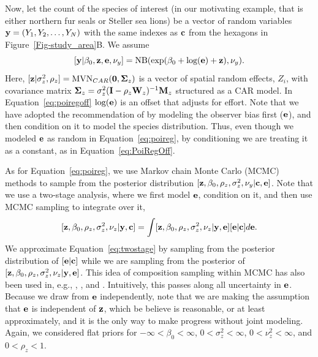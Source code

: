 \documentclass[11pt, titlepage]{article}
\begin{document}
\begin{spacing}{1.9}
\begin{flushleft}
Now, let the count of the species of interest (in our motivating example, that is either northern fur seals or Steller sea lions) be a vector of random variables $\mathbf{y} = (Y_{1}, Y_{2}, \ldots, Y_{N})$ with the same indexes as $\mathbf{c}$ from the hexagons in Figure~\ref{Fig-study_area}B.  We assume
\begin{equation} \label{eq:poiregoff}
[\mathbf{y}|\beta_{0},\mathbf{z},\mathbf{e},\nu_{y}] = \textrm{NB}(\exp(\beta_{0} + \textrm{log}(\mathbf{e}) + \mathbf{z}), \nu_{y}).
\end{equation}
Here, $[\mathbf{z}|\sigma^{2}_{z}, \rho_{z}] = \textrm{MVN}_{CAR}(\mathbf{0},\mbox{\boldmath $\Sigma$}_{z})$ is a vector of spatial random effects, $Z_{i}$, with covariance matrix $\mbox{\boldmath $\Sigma$}_{z} = \sigma_{z}^{2}(\mathbf{I} - \rho_{z}\mathbf{W}_{z})^{-1}\mathbf{M}_{z}$ structured as a CAR model.  In Equation~\eqref{eq:poiregoff} $\textrm{log}(\mathbf{e})$ is an offset that adjusts for effort. Note that we have adopted the recommendation of \citet{warton_model-based_2013} by modeling the observer bias first ($\mathbf{e}$), and then condition on it to model the species distribution.  Thus, even though we modeled $\mathbf{e}$ as random in Equation~\eqref{eq:poireg}, by conditioning we are treating it as a constant, as in Equation~\eqref{eq:PoiRegOff}.

As for Equation~\eqref{eq:poireg}, we use Markov chain Monte Carlo (MCMC) methods to sample from the posterior distribution $[\mathbf{z}, \beta_{0}, \rho_{z}, \sigma^{2}_{z},\nu_{y}|\mathbf{c},\mathbf{e}]$. Note that we use a two-stage analysis, where we first model $\mathbf{e}$, condition on it, and then use MCMC sampling to integrate over it, 
\begin{equation} \label{eq:twostage}
[\mathbf{z}, \beta_{0}, \rho_{z}, \sigma^{2}_{z},\nu_{z}|\mathbf{y},\mathbf{c}] = \int[\mathbf{z}, \beta_{0}, \rho_{z}, \sigma^{2}_{z},\nu_{z}|\mathbf{y},\mathbf{e}][\mathbf{e}|\mathbf{c}]d\mathbf{e}.
\end{equation}
We approximate Equation~\eqref{eq:twostage} by sampling from the posterior distribution of $[\mathbf{e}|\mathbf{c}]$ while we are sampling from the posterior of $[\mathbf{z}, \beta_{0}, \rho_{z}, \sigma^{2}_{z},\nu_{z}|\mathbf{y},\mathbf{e}]$. This idea of composition sampling within MCMC has also been used in, e.g., \citet{BanerjeeEtAl2008Gaussianpredictiveprocess825}, \citet{hooten_agent-based_2010}, and \citet{babcock_lidar_2015}. Intuitively, this passes along all uncertainty in $\mathbf{e}$. Because we draw from $\mathbf{e}$ independently, note that we are making the assumption that $\mathbf{e}$ is independent of $\mathbf{z}$, which be believe is reasonable, or at least approximately, and it is the only way to make progress without joint modeling. Again, we considered flat priors for $-\infty < \beta_{0} < \infty$, $0 < \sigma^{2}_{z} < \infty$, $0 < \nu^{2}_{z} < \infty$, and $0 < \rho_{z} < 1$.


\end{flushleft}
\end{spacing}
\end{document}
